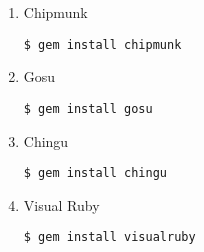\begin{enumerate}
\item Chipmunk
\begin{verbatim}
$ gem install chipmunk
\end{verbatim}
\item Gosu
\begin{verbatim}
$ gem install gosu
\end{verbatim}
\item Chingu
\begin{verbatim}
$ gem install chingu
\end{verbatim}
\item Visual Ruby
\begin{verbatim}
$ gem install visualruby
\end{verbatim}
\end{enumerate}

